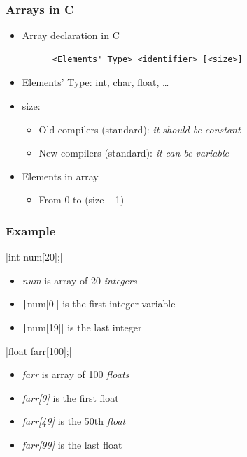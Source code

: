 \documentclass{../c-lecture}
\begin{document}
\begin{frame}[fragile]
  \frametitle{Arrays in C}
  \begin{itemize}
    \item Array declaration in C
    \begin{verbatim}
      <Elements' Type> <identifier> [<size>]
    \end{verbatim}
    \item
      Elements' Type: int, char, float,
      \ldots

    \item size:
    \begin{itemize}
      \item
        Old compilers (standard):
        \textit{\color{RedOrange} it should be constant}
      \item
        New compilers (standard): \textit{\color{RubineRed} it can be variable}
    \end{itemize}
    \item Elements in array
    \begin{itemize}
      \item From 0 to (size – 1)
    \end{itemize}
  \end{itemize}
\end{frame}

\begin{frame}[fragile]
  \frametitle{Example}
  |int num[20];|
  \begin{itemize}
    \item
      \textit{\color{Orange} num} is array of 20
      \textit{\color{LimeGreen} integers}
    \item \texttt|num[0]| is the first integer variable
    \item \texttt|num[19]| is the last integer
  \end{itemize}
  |float farr[100];|
  \begin{itemize}
    \item
      \textit{\color{YellowOrange} farr} is array of 100
      \textit{\color{GreenYellow} floats}
    \item \textit{\color{Purple} farr[0]} is the first float
    \item
      \textit{\color{YellowOrange} farr[49]} is the 50th
      \textit{\color{GreenYellow} float}
    \item \textit{\color{Purple} farr[99]} is the last float
  \end{itemize}
\end{frame}
\end{document}
